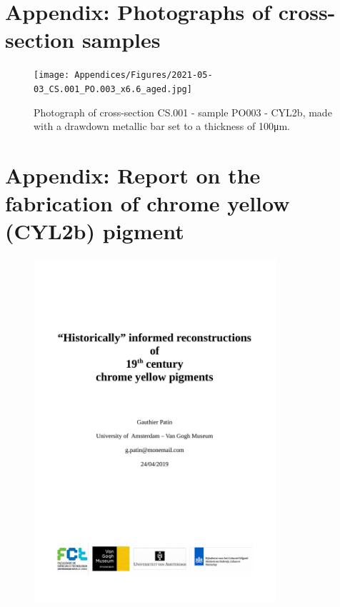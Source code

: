 \begin{appendices}


\newpage
\section[\hspace{0.3cm}Photographs of cross-section samples]{ Appendix: Photographs of cross-section samples}
\label{app:ch4_PO_thickness}

\begin{figure}[!h]
\centering
\texttt{[image: Appendices/Figures/2021-05-03\_CS.001\_PO.003\_x6.6\_aged.jpg]}
\caption*{Photograph of cross-section CS.001 - sample PO003 - \gls{CYL2b}, made with a drawdown metallic bar set to a thickness of 100\unit{\um}.}
\label{fig:CS.001_PO003}
\end{figure}




\newpage
\section[\hspace{0.3cm}Report on the fabrication of chrome yellow (\acrshort{CYL2b}) pigment]{ Appendix: Report on the fabrication of chrome yellow (\gls{CYL2b}) pigment}
\label{app:ch4_making_CYL2b_pigments}

\begin{figure}[!h]
\centering
\includegraphics[width=0.8\textwidth]{Appendices/2019-04-24_CY_Pigment_Fabrication_Report_p1.pdf}
\end{figure}


\end{appendices}
